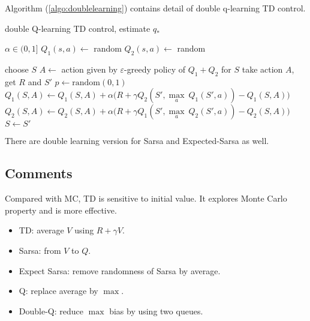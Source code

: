 Algorithm (\ref{algo:doublelearning}) contains detail of double q-learning TD control.

\begin{algorithm}
	\caption{double Q-learning TD control, estimate $q_*$}\label{algo:doublelearning}	
	
	\begin{algorithmic}[1]
		\State $ \alpha \in (0,1]$
		\State $Q_1(s,a) \gets$ random
		\State $Q_2(s,a) \gets$ random		
		
		\Statex
		
		\Loop
			\State choose $S$
			\Repeat
				\State $A \gets$ action given by $\varepsilon$-greedy policy of $Q_1+Q_2$ for $S$
				\State take action $A$, get $R$ and $S'$
				\State $p \gets \text{random}(0,1)$
					\State $Q_1(S,A) \gets Q_1(S,A) + \alpha \Big(R + \gamma Q_2(S',  \underset{a}{\max}\  Q_1(S',a)) - Q_1(S,A)\Big)$
				\Else
					\State $Q_2(S,A) \gets Q_2(S,A) + \alpha \Big(R + \gamma Q_1(S',\underset{a}{\max}\  Q_2(S',a)) - Q_2(S,A)\Big)$
				\EndIf
				\State $S \gets S'$
		\EndLoop		
	\end{algorithmic}
\end{algorithm}

There are double learning version for Sarsa and Expected-Sarsa as well.


\subsection{Comments}

Compared with MC, TD is sensitive to initial value. It explores Monte Carlo property and is more effective. 


\begin{itemize}
    \item TD: average $V$ using $R + \gamma V$.
    \item Sarsa: from $V$ to $Q$.
    \item Expect Sarsa: remove randomness of Sarsa by average.
    \item Q: replace average by $\max$.
    \item Double-Q: reduce $\max$ bias by using two queues.
\end{itemize}
